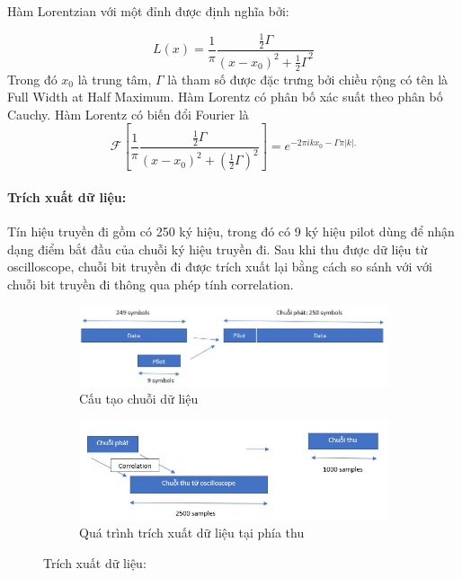 Hàm Lorentzian với một đỉnh được định nghĩa bởi:

\begin{equation}
L(x) = \frac{1}{\pi}\frac{\frac{1}{2} \Gamma}{{(x-x_0)}^2+ {\frac{1}{2} \Gamma}^2}
\end{equation}
 Trong đó $x_0$ là trung tâm, $\Gamma$ là tham số được đặc trưng bởi chiều rộng có tên là Full Width at Half Maximum. Hàm Lorentz có phân bố xác suất theo phân bố Cauchy. Hàm Lorentz có biến đổi Fourier là 
\begin{equation}
\mathcal{F}[\frac{1}{\pi}\frac{\frac{1}{2}\Gamma}{(x-x_0)^2 + (\frac{1}{2}\Gamma)^2}] =e^{-2\pi i k x_0 - \Gamma \pi |k|.} 
\end{equation}

\paragraph{Trích xuất dữ liệu:}

Tín hiệu truyền đi gồm có 250 ký hiệu, trong đó có 9 ký hiệu pilot dùng để nhận dạng điểm bắt đầu của chuỗi ký hiệu truyền đi. 
Sau khi thu được dữ liệu từ oscilloscope, chuỗi bit truyền đi được trích xuất lại bằng cách so sánh với với chuỗi bit truyền đi thông qua phép tính correlation. 

\begin{figure}
	\centering
	\begin{subfigure}{.5\textwidth}
		  \centering
		  \includegraphics[width=1\linewidth]{Image/data_sequence}
		  \caption{Cấu tạo chuỗi dữ liệu}
	\end{subfigure}%
	\begin{subfigure}{.5\textwidth}
		  \centering
		  \includegraphics[width=1\linewidth]{Image/data_extracting}
		  \caption{Quá trình trích xuất dữ liệu tại phía thu}
	\end{subfigure}
	\caption{Trích xuất dữ liệu:}
	\label{fig: signal_extraction}
\end{figure}

